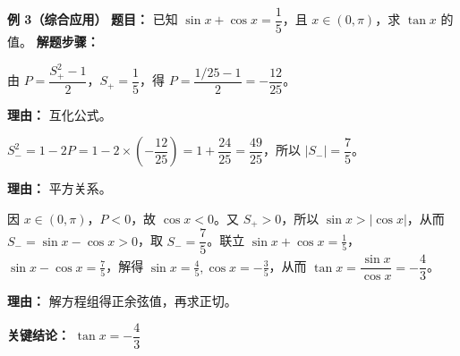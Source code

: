 \begin{examplebox}
	\medskip
	\textbf{\textcolor{CExample}{例 3（综合应用）}}
	\textbf{\textcolor{CExample}{题目：}}
	已知 $\sin x+\cos x = \dfrac15$，且 $x\in(0,\pi)$，求 $\tan x$ 的值。
	\textbf{\textcolor{CExample}{解题步骤：}}
	\begin{description}[style=nextline, leftmargin=2.8em, labelsep=0.5em, itemsep=0.45em]
		\item[\textbf{第一步（求积）：}]
			由 $P=\dfrac{S_+^2-1}{2}$，$S_+=\dfrac15$，得 $P=\dfrac{1/25-1}{2} = -\dfrac{12}{25}$。
			\par\textbf{理由：} 互化公式。
		\item[\textbf{第二步（求差平方）：}]
			$S_-^2 = 1-2P = 1-2\times\left(-\dfrac{12}{25}\right)=1+\dfrac{24}{25}=\dfrac{49}{25}$，所以 $|S_-|=\dfrac75$。
			\par\textbf{理由：} 平方关系。
		\item[\textbf{第三步（联合求解）：}]
			因 $x\in(0,\pi)$，$P<0$，故 $\cos x<0$。又 $S_+>0$，所以 $\sin x>|\cos x|$，从而 $S_-=\sin x-\cos x>0$，取 $S_-=\dfrac75$。联立 $\sin x+\cos x=\frac15$，$\sin x-\cos x=\frac75$，解得 $\sin x=\frac45,\cos x=-\frac35$，从而 $\tan x=\dfrac{\sin x}{\cos x}=-\dfrac43$。
			\par\textbf{理由：} 解方程组得正余弦值，再求正切。
	\end{description}
	\textbf{\textcolor{CExample}{关键结论：}}
	\textbf{$\tan x=-\dfrac43$}
\end{examplebox}
